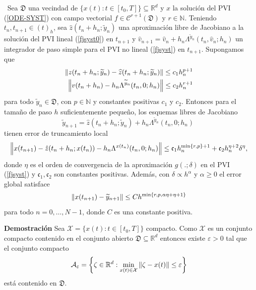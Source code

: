 \begin{theorem} \label{theorem:fj-llrk-convergence}
\cite{naranjo2023jacobian}~Sea $\mathfrak{D}$ una vecindad de $\{x(t):t\in [t_0,T]\} \subseteq \mathbb{R}^{d}$ y $x$ la solución del PVI (\ref{ODE-SYST}) con campo vectorial $f\in \mathcal{C}^{r+1}(\mathfrak{D})$ y $r \in \mathbb{N}$. Teniendo $t_n,t_{n+1}\in (t)_h$, sea $\hat{z}(t_n+h_n;\widetilde{y}_n)$ una aproximación libre de Jacobiano a la solución del PVI lineal (\ref{fjsyst0}) en $t_{n+1}$ y  $\widehat{v}_{n+1}=\widehat{v}_n+h_n\Lambda^{\widetilde{y}_n}(t_n,\widehat{v}_n;h_n)$ un integrador de paso simple para el PVI no lineal (\ref{fjsyst}) en $t_{n+1}$. Supongamos que
\begin{align}
	\left\lVert z(t_n+h_n;\widetilde{y}_n)-\widehat{z}(t_n+h_n;\widetilde{y}_n) \right\rVert \leq c_1 h_n^{p+1} \\
	\left\lVert v(t_n+h_n)-h_n\Lambda^{\widetilde{y}_n}(t_n,0;h_n) \right\rVert\leq c_2 h_n^{r+1}  \label{ineq:bound32}
\end{align}
para todo $\widetilde{y}_n \in \mathfrak{D}$, con  $p \in \mathbb{N}$ y constantes positivas  $c_1$ y $c_2$. Entonces para el tamaño de paso $h$ suficientemente pequeño, los esquemas libres de Jacobiano
\begin{equation*}
    \widetilde{y}_{n+1}= \hat{z}(t_n+h_n;\widetilde{y}_n)+h_n\Lambda^{\widetilde{y}_n}(t_n,0;h_n)\;
\end{equation*}
tienen error de truncamiento local
\begin{equation*}
    \left\lVert x(t_{n+1})-\hat{z}(t_n+h_n;x(t_n))-h_n\Lambda^{x(t_n)}(t_n,0;h_n) \right\rVert\leq \mathfrak{c}_1 h_n^{\min\{r,p\}+1} + \mathfrak{c}_2 h_n^{\eta+2}\delta^{\eta},
\end{equation*}
donde $\eta$ es el orden de convergencia de la aproximación $g(.;\delta)$ en el PVI (\ref{fjsyst}) y $\mathfrak{c}_1,\mathfrak{c}_2$ son constantes positivas. Además, con $\delta\propto h^{\alpha}$ y  $\alpha \geq 0$ el error global satisface
\begin{equation*}
    \left\lVert x(t_{n+1})-\widetilde{y}_{n+1} \right\rVert\leq Ch^{\min\{r,p,\alpha\eta+\eta+1\}}
\end{equation*}
para todo  $n=0,\ldots,N-1$, donde $C$ es una constante positiva.
\end{theorem}

\textbf{Demostración}
Sea $\mathcal{X}=\{ x(t): t\in [t_0,T] \}$ compacto. Como $\mathcal{X}$ es un conjunto compacto contenido en el conjunto abierto $\mathfrak{D}\subseteq \mathbb{R}^d$ entonces existe $\varepsilon>0$ tal que el conjunto compacto
\begin{equation*}
    \mathcal{A}_{\varepsilon}=\left\{ \zeta \in\mathbb{R}^d: \min\limits_{x(t)\in \mathcal{X}}\left\lVert \zeta -x(t) \right\rVert\leq \varepsilon \right\}
\end{equation*}
está contenido en $\mathfrak{D}$.


